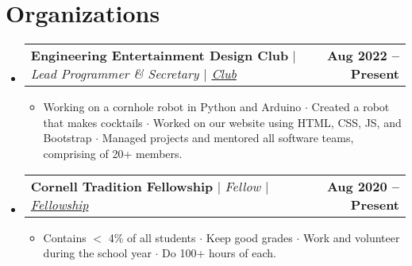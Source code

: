 \documentclass[letterpaper,11pt]{article}
\makeatletter
\newcommand{\resumeItem}[1]{
  \item\small{
    {#1 \vspace{-2pt}}
  }
}
\newcommand{\resumeProjectHeading}[2]{
    \item
    \begin{tabular*}{1.001\textwidth}{l@{\extracolsep{\fill}}r}
      \small#1 & \textbf{\small #2}\\
    \end{tabular*}\vspace{-7pt}
}
\newcommand{\resumeSubHeadingListStart}{\begin{itemize}[leftmargin=0.0in, label={}]}
\newcommand{\resumeSubHeadingListEnd}{\end{itemize}}
\newcommand{\resumeItemListStart}{\begin{itemize}}
\newcommand{\resumeItemListEnd}{\end{itemize}\vspace{-5pt}}
\makeatother
\begin{document}
\section{Organizations}
    \vspace{-6pt}
    \resumeSubHeadingListStart
    \resumeProjectHeading
          {\textbf{Engineering Entertainment Design Club} $|$ \emph{Lead Programmer \& Secretary  $|$
          \href{https://www.linkedin.com/company/cornell-entertainment-engineering-and-design-club/}{Club}}}{Aug 2022 -- Present}
          \resumeItemListStart
            \resumeItem{Working on a cornhole robot in Python and Arduino $\cdot$ Created a robot that makes cocktails $\cdot$ Worked on our website using HTML, CSS, JS, and Bootstrap 
            $\cdot$ Managed projects and mentored all software teams, comprising of 20+ members.}
          \resumeItemListEnd
          \vspace{-14pt}
    \resumeProjectHeading
          {\textbf{Cornell Tradition Fellowship} $|$ \emph{Fellow $|$
          \href{https://scl.cornell.edu/get-involved/cornell-commitment/cornell-tradition}{Fellowship}
          }}{Aug 2020 -- Present}
          \resumeItemListStart
            \resumeItem{Contains $<$ 4\% of all students $\cdot$ Keep good grades
             $\cdot$ Work and volunteer during the school year $\cdot$ Do 100+ hours of each.}
          \resumeItemListEnd
          \vspace{-14pt}
    \resumeSubHeadingListEnd
\vspace{-3pt}
\end{document}
